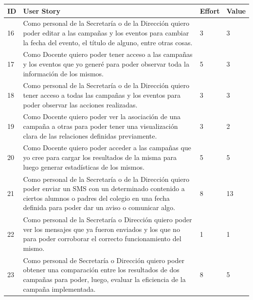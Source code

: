 \documentclass[a4paper, 11pt]{article}
\begin{document}
\begin{table}[H]
\centering
\begin{tabular}{ | p{1cm} | p{10cm} | p{1cm} | p{1cm} |}
\hline
ID & User Story & Effort & Value \\ \hline \hline

16 & Como personal de la Secretaría o de la Dirección quiero poder editar a las campañas y los eventos para cambiar la fecha del evento, el título de alguno, entre otras cosas. & 3 & 3\\ \hline


17 & Como Docente quiero poder tener acceso a las campañas y los eventos que yo generé para poder observar toda la información de los mismos. & 5 & 3\\ \hline


18 & Como personal de la Secretaría o de la Dirección quiero tener acceso a todas las campañas y los eventos para poder observar las acciones realizadas. & 3 & 3 \\ \hline


19 & Como Docente quiero poder ver la asociación de una campaña a otras para poder tener una visualización clara de las relaciones definidas previamente. & 3 & 2 \\ \hline


20 & Como Docente quiero poder acceder a las campañas que yo cree para cargar los resultados de la misma para luego generar estadísticas de los mismos. & 5 & 5 \\ \hline


21 & Como personal de la Secretaría o de la Dirección quiero poder enviar un SMS con un determinado contenido a ciertos alumnos o padres del colegio en una fecha definida para poder dar un aviso o comunicar algo. & 8 & 13 \\ \hline


22 & Como personal de la Secretaría o Dirección quiero poder ver los mensajes que ya fueron enviados y los que no para poder corroborar el correcto funcionamiento del mismo. & 1 & 1 \\ \hline


23 & Como personal de Secretaría o Dirección quiero poder obtener una comparación entre los resultados de dos campañas para poder, luego, evaluar la eficiencia de la campaña implementada. & 8 & 5\\ \hline

\end{tabular}
\end{table}
\end{document}
